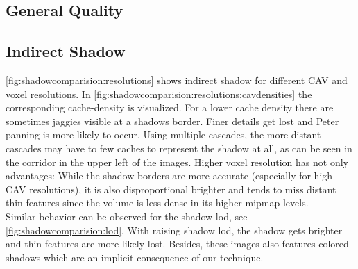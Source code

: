 \documentclass[thesis.tex]{subfiles}
\begin{document}


%

\subsection{General Quality}

\subsection{Indirect Shadow}
\autoref{fig:shadowcomparision:resolutions} shows indirect shadow for different CAV and voxel resolutions.
In \autoref{fig:shadowcomparision:resolutions:cavdensities} the corresponding cache-density is visualized.
For a lower cache density there are sometimes jaggies visible at a shadows border.
Finer details get lost and Peter panning is more likely to occur.
Using multiple cascades, the more distant cascades may have to few caches to represent the shadow at all, as can be seen in the corridor in the upper left of the images.
Higher voxel resolution has not only advantages:
While the shadow borders are more accurate (especially for high CAV resolutions), it is also disproportional brighter and tends to miss distant thin features since the volume is less dense in its higher mipmap-levels.
\\
Similar behavior can be observed for the shadow lod, see \autoref{fig:shadowcomparision:lod}.
With raising shadow lod, the shadow gets brighter and thin features are more likely lost.
Besides, these images also features colored shadows which are an implicit consequence of our technique.
\end{document}
